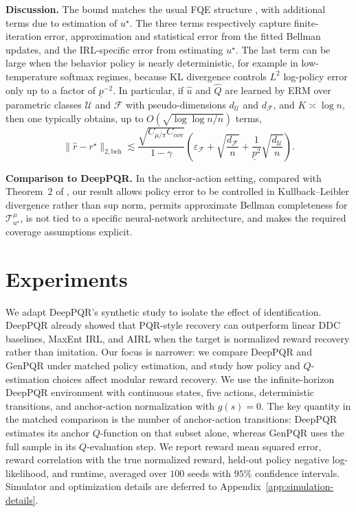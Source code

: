 \documentclass{article}
\newcommand{\1}{\mathbbm{1}}
\begin{document}
\textbf{Discussion.}
The bound matches the usual FQE structure
\citep{munos2008finite,van2025fitted}, with additional terms due to estimation
of \(u^\star\). The three terms respectively capture finite-iteration error,
approximation and statistical error from the fitted Bellman updates, and the
IRL-specific error from estimating \(u^\star\). The last term can be large when
the behavior policy is nearly deterministic, for example in low-temperature
softmax regimes, because KL divergence controls \(L^2\) log-policy error only
up to a factor of \(\underline p^{-2}\). In particular, if \(\hat u\) and
\(\hat Q\) are learned by ERM over parametric classes \(\mathcal U\) and
\(\mathcal F\) with pseudo-dimensions \(d_{\mathcal U}\) and
\(d_{\mathcal F}\), and \(K \asymp \log n\), then one typically obtains, up to
\(O(\sqrt{\log \log n / n})\) terms,
\[
\|\hat r-r^\star\|_{2,\mathrm{beh}}
\lesssim
\frac{\sqrt{C_{\mu/\pi}C_{\mathrm{cov}}}}{1-\gamma}
\left(
\varepsilon_{\mathcal F}
+
\sqrt{\frac{d_{\mathcal F}}{n}}
+
\frac{1}{\underline p^{2}}\sqrt{\frac{d_{\mathcal U}}{n}}
\right).
\]


\textbf{Comparison to DeepPQR.}
In the anchor-action setting, compared with Theorem~2 of
\citet{geng2020deep}, our result allows policy error to be controlled in
Kullback--Leibler divergence rather than sup norm, permits approximate Bellman
completeness for \(\mathcal T^\mu_{u^\star}\), is not tied to a specific
neural-network architecture, and makes the required coverage assumptions
explicit.

\section{Experiments}
\label{sec:experiments}

We adapt DeepPQR's synthetic study to isolate the effect of identification. DeepPQR already showed that PQR-style recovery can outperform linear DDC baselines, MaxEnt IRL, and AIRL when the target is normalized reward recovery rather than imitation. Our focus is narrower: we compare DeepPQR and GenPQR under matched policy estimation, and study how policy and \(Q\)-estimation choices affect modular reward recovery. We use the infinite-horizon DeepPQR environment with continuous states, five actions, deterministic transitions, and anchor-action normalization with \(g(s)=0\). The key quantity in the matched comparison is the number of anchor-action transitions: DeepPQR estimates its anchor \(Q\)-function on that subset alone, whereas GenPQR uses the full sample in its \(Q\)-evaluation step. We report reward mean squared error, reward correlation with the true normalized reward, held-out policy negative log-likelihood, and runtime, averaged over \(100\) seeds with \(95\%\) confidence intervals. Simulator and optimization details are deferred to Appendix~\ref{app:simulation-details}.
\end{document}
